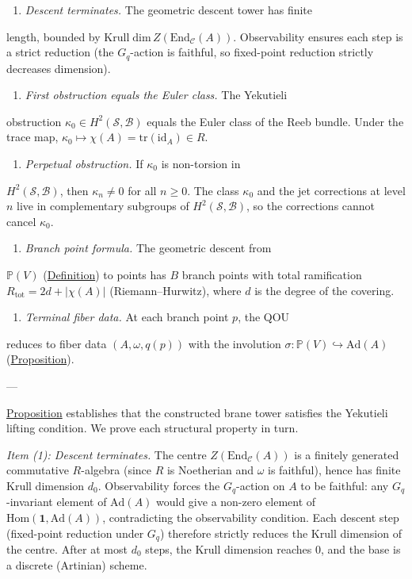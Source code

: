 \begin{theorem}
\begin{enumerate}
  \item \emph{Descent terminates.}  The geometric descent tower has finite
\end{enumerate}
   length, bounded by $\mathrm{Krull\;dim}\,
   Z(\mathrm{End}_{\mathcal{C}}(A))$.  Observability ensures each step
   is a strict reduction (the $G_q$-action is faithful, so fixed-point
   reduction strictly decreases dimension).
\begin{enumerate}
  \item \emph{First obstruction equals the Euler class.}  The Yekutieli
\end{enumerate}
   obstruction $\kappa_0 \in H^2(\mathcal{S}, \mathcal{B})$ equals the
   Euler class of the Reeb bundle.  Under the trace map,
   $\kappa_0 \mapsto \chi(A) = \mathrm{tr}(\mathrm{id}_A) \in R$.
\begin{enumerate}
  \item \emph{Perpetual obstruction.}  If $\kappa_0$ is non-torsion in
\end{enumerate}
   $H^2(\mathcal{S}, \mathcal{B})$, then $\kappa_n \neq 0$ for all
   $n \geq 0$.  The class $\kappa_0$ and the jet corrections at
   level $n$ live in complementary subgroups of
   $H^2(\mathcal{S}, \mathcal{B})$, so the corrections cannot cancel
   $\kappa_0$.
\begin{enumerate}
  \item \emph{Branch point formula.}  The geometric descent from
\end{enumerate}
   $\mathbb{P}(V)$ (\hyperref[def:projective-line-object]{Definition}) to
   points has $B$ branch points with total ramification
   $R_{\mathrm{tot}} = 2d + \lvert\chi(A)\rvert$ (Riemann--Hurwitz),
   where $d$ is the degree of the covering.
\begin{enumerate}
  \item \emph{Terminal fiber data.}  At each branch point $p$, the QOU
\end{enumerate}
   reduces to fiber data $(A, \omega, q(p))$ with the involution
   $\sigma \colon \mathbb{P}(V) \hookrightarrow \mathrm{Ad}(A)$
   (\hyperref[prop:fiber-adjoint-involution]{Proposition}).

---

\hyperref[prop:yekutieli-lifting]{Proposition} establishes that the constructed
brane tower satisfies the Yekutieli lifting condition.  We prove each
structural property in turn.

\emph{Item (1): Descent terminates.}
The centre $Z(\mathrm{End}_{\mathcal{C}}(A))$ is a finitely generated
commutative $R$-algebra (since $R$ is Noetherian and $\omega$ is faithful),
hence has finite Krull dimension $d_0$.  Observability forces the $G_q$-action
on $A$ to be faithful: any $G_q$-invariant element of $\mathrm{Ad}(A)$ would
give a non-zero element of $\mathrm{Hom}(\mathbf{1}, \mathrm{Ad}(A))$,
contradicting the observability condition.  Each descent step (fixed-point
reduction under $G_q$) therefore strictly reduces the Krull dimension of the
centre.  After at most $d_0$ steps, the Krull dimension reaches $0$, and the
base is a discrete (Artinian) scheme.


\end{theorem}
